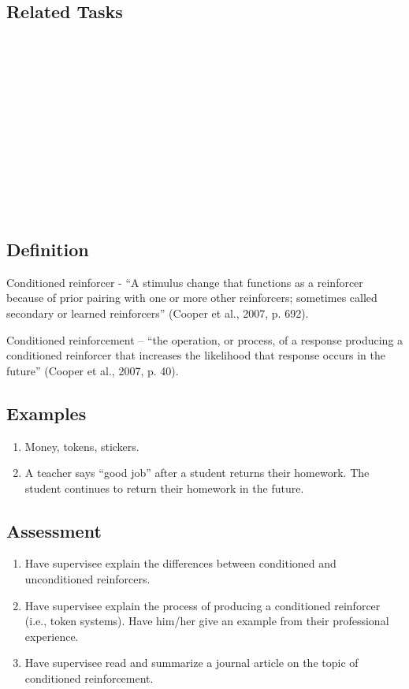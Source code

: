 \subsection{Related Tasks}
\fourcOne{}\\
\fourdOne{}\\\
\fourdTwo{}\\\
\fourdNineteen{}\\
\fourFKTwo{}\\
\fourFKThirteen{}\\
\fourFKSixteen{}\\
\fourFKNineteen{}\\
\fourFKTwentyOne{}\\
\fourFKTwentySix{}\\
\fourFKThirty{}\\
%
%
%
%
%
%
%
\section{\fourFKEighteen{}}
\subsection{Definition}
Conditioned reinforcer - ``A stimulus change that functions as a reinforcer because of prior pairing with one or more other reinforcers; sometimes called secondary or learned reinforcers'' (Cooper et al., 2007, p. 692). 

Conditioned reinforcement – ``the operation, or process, of a response producing a conditioned reinforcer that increases the likelihood that response occurs in the future'' (Cooper et al., 2007, p. 40).
%
\subsection{Examples}
\begin{enumerate}
\item  Money, tokens, stickers.
\item A teacher says ``good job'' after a student returns their homework. The student continues to return their homework in the future. 
%
\end{enumerate}
%
\subsection{Assessment}
\begin{enumerate}
\item Have supervisee explain the differences between conditioned and unconditioned reinforcers.
\item Have supervisee explain the process of producing a conditioned reinforcer (i.e., token systems). Have him/her give an example from their professional experience.
\item Have supervisee read and summarize a journal article on the topic of conditioned reinforcement. 
\end{enumerate}
%
